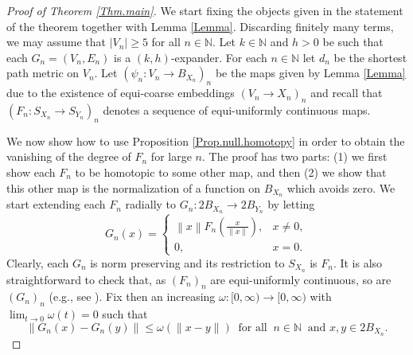 \documentclass[11pt]{amsart}
\newcommand{\N}{\mathbb{N}}
\theoremstyle{definition}
\theoremstyle{remark}
\newcommand{\norm}[1]{\left\lVert #1 \right\rVert}
\begin{document}
 

\begin{proof}[Proof of Theorem \ref{Thm.main}]
We start fixing the objects given in the statement of the theorem together with Lemma \ref{Lemma}. Discarding finitely many terms, we may assume that $|V_n|\geq5$ for all $n\in\N$. Let  $k\in\N$ and $h>0$ be such that each $G_n=(V_n,E_n)$ is a $(k,h)$-expander. For each $n\in\N$ let $d_n$ be the shortest path metric on $V_n$. Let $(\psi_n\colon V_n\to B_{X_n})_n$ be the maps given by Lemma \ref{Lemma} due to the existence of  equi-coarse embeddings $(V_n\to X_n)_n$ and recall that  $(F_n\colon S_{X_n}\to S_{Y_n})_n$ denotes a  sequence of equi-uniformly continuous maps.
 


We  now  show how to use Proposition \ref{Prop.null.homotopy} in order to obtain the vanishing of the degree of $F_n$ for large $n$. The proof has two parts: (1) we first show each $F_n$ to be homotopic to some other map, and then (2) we show that this other map is the normalization of a function on $B_{X_n}$ which avoids zero. We start extending each $F_n$ radially to $G_n:2B_{X_n}\to2B_{Y_n}$ by letting \[
  G_n(x)=
  \begin{cases}
    \norm{x}F_n\left(\frac{x}{\norm{x}}\right),&x\neq0,\\
    0,&x=0.
  \end{cases}
\]
Clearly,   each $G_n$ is  norm preserving and its restriction to $S_{X_n}$ is $F_n$. It is also straightforward to check that, as $(F_n)_n$ are equi-uniformly continuous,  so are $(G_n)_n$ (e.g., see \cite[Proposition 2.9]{OdellSchlumprecht1994Acta}). Fix then an increasing $\omega\colon [0,\infty)\to [0,\infty)$  with $\lim_{t\to 0}\omega(t)=0$ such that
\[\|G_n(x)-G_n(y)\|\leq \omega(\|x-y\|)\ \text{ for all }\ n\in\N\ \text{ and  }x,y\in 2B_{X_n}.\] 
 
 


\end{proof}
\end{document}
